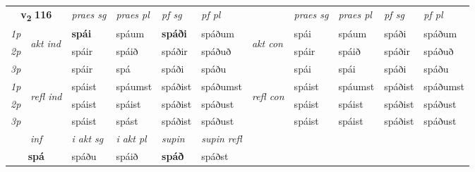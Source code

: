 \noindent
\begin{tabular}{lllllllllll} \toprule
\multicolumn{2}{c}{\textbf{v{\textsubscript{2}}} \Large{\textbf{116}}}  &  \textit{praes sg}  & \textit{praes pl}  &\textit{ pf sg} & \textit{pf pl} &  &  \textit{praes sg}  & \textit{praes pl}  & \textit{pf sg} & \textit{pf pl } \\*
	\cmidrule{3-6} \cmidrule{8-11}
 {\textit{1p}} & \multirow{3}{*}{\begin{turn}{90}\textit{akt ind}\end{turn}} & \textbf{spái} & spáum & \textbf{spáði} & spáðum & \multirow{3}{*}{\begin{turn}{90}\textit{akt con}\end{turn}} &spái & spáum & spáði & spáðum\\*
 {\textit{2p}} &  &  spáir  & spáið & spáðir & spáðuð & & spáir & spáið & spáðir & spáðuð \\*
{\textit{3p}} &  & spáir & spá & spáði & spáðu & & spái & spái& spáði & spáðu \\*
\cmidrule{3-6} \cmidrule{8-11}
 {\textit{1p}} & \multirow{3}{*}{\begin{turn}{90}\textit{refl ind}\end{turn}}  & spáist & spáumst & spáðist & spáðumst & \multirow{3}{*}{\begin{turn}{90}\textit{refl con}\end{turn}}  &spáist & spáumst & spáðist & spáðumst \\*
 {\textit{2p}} &  & spáist & spáist & spáðist & spáðust & &spáist & spáist & spáðist & spáðust \\*
 {\textit{3p}}  & & spáist & spást & spáðist & spáðust & & spáist & spáist& spáðist & spáðust \\*
\cmidrule{3-6} \cmidrule{8-11}

   \multicolumn{2}{c}{\textit{inf}}  & \textit{i akt sg} & \textit{i akt pl}    & \textit{supin} & \textit{supin refl}  \\*
  \multicolumn{2}{c}{\textbf{spá}} & spáðu  & spáið    &  \textbf{spáð} & spáðst  \\*
\end{tabular}

